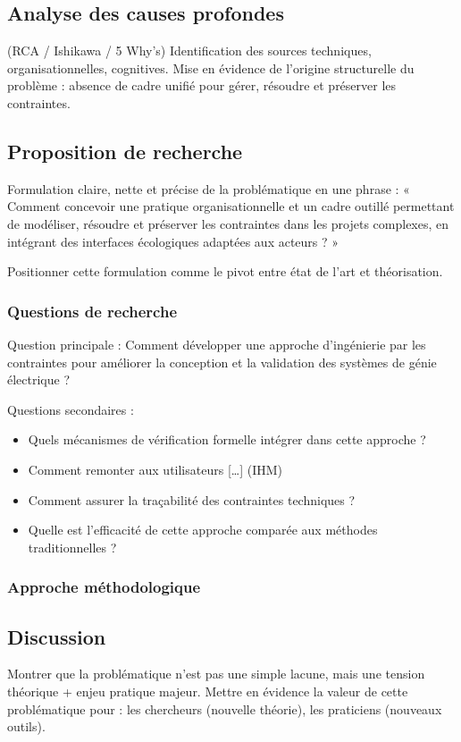 \documentclass[a4paper,12pt]{article}
\begin{document}
\subsection{Analyse des causes profondes}
\label{sec:org2f190a5}
(RCA / Ishikawa / 5 Why’s)
Identification des sources techniques, organisationnelles, cognitives.
Mise en évidence de l’origine structurelle du problème : absence de cadre unifié pour gérer, résoudre et préserver les contraintes.
\subsection{Proposition de recherche}
\label{sec:org9fb5feb}
Formulation claire, nette et précise de la problématique en une phrase :
« Comment concevoir une pratique organisationnelle et un cadre outillé permettant de modéliser, résoudre et préserver les contraintes dans les projets complexes, en intégrant des interfaces écologiques adaptées aux acteurs ? »

Positionner cette formulation comme le pivot entre état de l’art et théorisation.
\subsubsection{Questions de recherche}
\label{sec:orgdaa4da3}
Question principale : Comment développer une approche d'ingénierie par les contraintes pour améliorer la conception et la validation des systèmes de génie électrique ?

Questions secondaires :
\begin{itemize}
\item Quels mécanismes de vérification formelle intégrer dans cette approche ?
\item Comment remonter aux utilisateurs [\ldots{}] (IHM)
\item Comment assurer la traçabilité des contraintes techniques ?
\item Quelle est l'efficacité de cette approche comparée aux méthodes traditionnelles ?
\end{itemize}
\subsubsection{Approche méthodologique}
\label{sec:org8dbb1e0}
\subsection{Discussion}
\label{sec:org916939f}
Montrer que la problématique n’est pas une simple lacune, mais une tension théorique + enjeu pratique majeur.
Mettre en évidence la valeur de cette problématique pour :
les chercheurs (nouvelle théorie),
les praticiens (nouveaux outils).
\end{document}
